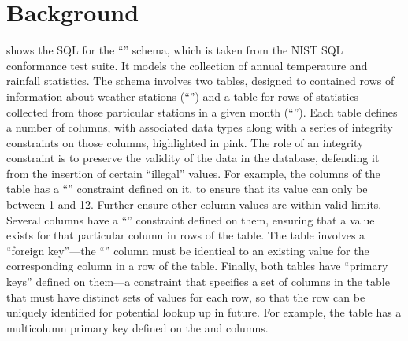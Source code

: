 
\section{Background}
\label{sec:background}



  shows the SQL for the ``\NistWeather'' schema, which is taken from the NIST SQL conformance test suite. It models the collection of annual temperature and rainfall statistics. The schema involves two tables, designed to contained rows of information about weather stations (``'') and a table for rows of statistics collected from those particular stations in a given month (``''). Each table defines a number of columns, with associated data types along with a series of integrity constraints on those columns, highlighted in pink. The role of an integrity constraint is to preserve the validity of the data in the database, defending it from the insertion of certain ``illegal'' values. For example, the  columns of the  table has a ``\CHECK'' constraint defined on it, to ensure that its value can only be between 1 and 12. Further \CCs ensure other column values are within valid limits. Several columns have a ``\NOTNULL'' constraint defined on them, ensuring that a value exists for that particular column in rows of the table. The  table involves a ``foreign key''---the ``'' column must be identical to an existing value for the corresponding  column in a row of the  table. Finally, both tables have ``primary keys'' defined on them---a constraint that specifies a set of columns in the table that must have distinct sets of values for each row, so that the row can be uniquely identified for potential lookup up in future. For example, the  table has a multicolumn primary key defined on the  and  columns. 





